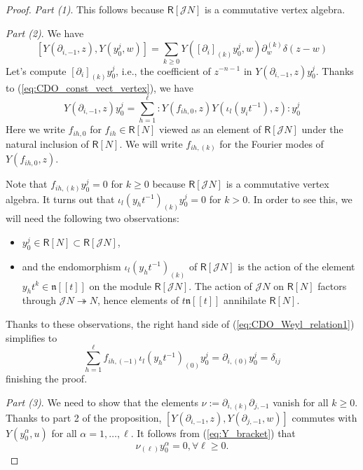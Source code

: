 \documentclass{amsart}
\theoremstyle{definition}
\newcommand{\Ring}{\mathsf{R}}
\newcommand{\Jet}{\mathscr{J}}
\numberwithin{equation}{section}
\begin{document}
\begin{proof}
{\it Part (1)}. This follows because $\Ring[\Jet N]$ is a commutative vertex algebra.

{\it Part (2)}. We have
    \[
    [Y(\partial_{i,-1}, z), Y(y^j_0, w)] = 
  \sum_{k \geqslant 0} Y([\partial_i]_{(k)} y^j_0, w) \partial_w^{(k)}\delta(z-w)  
    \]
    Let's compute $[\partial_i]_{(k)} y^j_0$, i.e., the coefficient of $z^{-n-1}$ in 
    $Y(\partial_{i,-1},z)y^j_0$. 
    Thanks to (\ref{eq:CDO_const_vect_vertex}),  we have
    \begin{equation}\label{eq:CDO_Weyl_relation1}
    Y(\partial_{i,-1},z)y^j_0=\sum_{h=1}^\ell :Y(f_{ih,0},z)Y(\iota_l(y_it^{-1}),z):y^j_0
    \end{equation}
Here we write $f_{ih,0}$ for $f_{ih}\in \Ring[N]$ viewed as an element of $\Ring[\Jet N]$ under the natural inclusion of $\Ring[N]$. We will write $f_{ih,(k)}$ for the Fourier modes of $Y(f_{ih,0},z)$.
    
    Note that $f_{ih,(k)}y^j_0=0$ for $k\geqslant 0$ because $\Ring[\Jet N]$ is a commutative vertex algebra. It turns out that $\iota_l(y_{h}t^{-1})_{(k)}y^j_0=0$ for $k>0$. In order to see this, we will need the following two observations:
    \begin{itemize}
    \item[(a)] $y_0^j\in \Ring[N]\subset \Ring[\Jet N]$,
    \item[(b)] and the endomorphism $\iota_l(y_{h}t^{-1})_{(k)}$ of $\Ring[\Jet N]$ is the action of the element $y_ht^k\in \mathfrak{n}[[t]]$ on the module $\Ring[\Jet N]$. The action of $\Jet N$ on $\Ring[N]$ factors through $\Jet N\twoheadrightarrow N$, hence elements of $t\mathfrak{n}[[t]]$ annihilate $\Ring[N]$.
    \end{itemize}
    
    Thanks to these observations, the right hand side of (\ref{eq:CDO_Weyl_relation1}) simplifies to 
    $$\sum_{h=1}^\ell f_{ih,(-1)}\iota_l(y_{h}t^{-1})_{(0)} y^j_0= \partial_{i,(0)}y^j_0=\delta_{ij}$$ finishing the proof. 
    
{\it Part (3)}.      We need to show that the elements 
    $\nu:=\partial_{i,(k)}\partial_{j,-1}$ vanish for all $k\geqslant 0$. Thanks to part 2 of the proposition, $[Y(\partial_{i,-1},z),Y(\partial_{j,-1},w)]$ commutes with $Y(y^\alpha_0,u)$ for all $\alpha=1,\ldots,\ell$. It follows from (\ref{eq:Y_bracket}) that 
    \begin{equation}\label{eq:CDO_nu_condition}
    \nu_{(\ell)}y^\alpha_0=0, \forall \ell\geqslant 0.
    \end{equation}


\end{proof}
\end{document}
